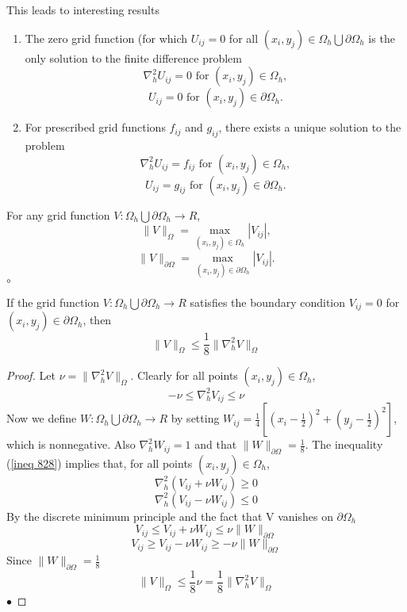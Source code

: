 This leads to interesting results
\begin{proposition}
\begin{enumerate}
\item
The zero grid function (for which $U_{ij}=0$ for all $(x_i,y_j) \in \Omega_h \bigcup \partial\Omega_h$
is the only solution to the finite difference problem
\[\nabla_h^2U_{ij}=0 \mbox{ for }(x_i,y_j)\in\Omega_h,\]
\[U_{ij}=0 \mbox{ for }(x_i,y_j)\in\partial\Omega_h.\]
\item
For prescribed grid functions $f_{ij}$ and $g_{ij}$, there exists a unique solution to the problem
\[\nabla_h^2U_{ij}=f_{ij} \mbox{ for }(x_i,y_j)\in\Omega_h,\]
\[U_{ij}=g_{ij} \mbox{ for }(x_i,y_j)\in\partial\Omega_h.\]
\end{enumerate}
\end{proposition}
\begin{definition}
For any grid function $V:\Omega_h\bigcup\partial\Omega_h \rightarrow R$,
\[\lVert V\rVert_{\Omega} =\max_{(x_i,y_j)\in\Omega_h}|V_{ij}|, \]
\[\lVert V\rVert_{\partial\Omega} =\max_{(x_i,y_j)\in\partial\Omega_h}|V_{ij}|. \]
$\circ$
\end{definition}
\begin{lemma}
If the grid function $V:\Omega_h\bigcup\partial\Omega_h\rightarrow R$ satisfies the boundary condition $V_{ij}=0$ for $(x_i,y_j)\in \partial\Omega_h$, then
\[\lVert V\rVert_{\Omega}\leq \frac{1}{8}\lVert \nabla_h^2V\rVert_{\Omega} \]
\end{lemma}
\begin{proof}
Let $\nu = \lVert \nabla_{h}^2V\rVert_{\Omega}$. Clearly for all points $(x_i,y_j)\in\Omega_h$,
\begin{equation}\label{ineq 828}
-\nu \leq \nabla_{h}^2V_{ij} \leq \nu \end{equation}
Now we define $W:\Omega_h \bigcup \partial\Omega_h \rightarrow R$ by setting 
$W_{ij}=\frac{1}{4}[(x_i-\frac{1}{2})^2+(y_j-\frac{1}{2})^2]$, which is nonnegative.  Also $\nabla_h^2W_{ij}=1$ and that $\lVert W\rVert_{\partial\Omega}=\frac{1}{8}$.
The inequality (\ref{ineq 828}) implies that, for all points $(x_i,y_j)\in\Omega_h$,
\[\nabla_h^2(V_{ij}+\nu W_{ij})\geq 0 \]
\[\nabla_h^2(V_{ij}-\nu W_{ij})\leq 0 \]
By the discrete minimum principle and the fact that V vanishes on $\partial\Omega_h$
\[V_{ij}\leq V_{ij}+\nu W_{ij}\leq \nu\lVert W\rVert_{\partial\Omega} \]
\[V_{ij}\geq V_{ij}-\nu W_{ij}\geq -\nu\lVert W\rVert_{\partial\Omega} \]
Since $\lVert W\rVert_{\partial\Omega}=\frac{1}{8}$
\[\lVert V\rVert_{\Omega}\leq \frac{1}{8}\nu =\frac{1}{8}\lVert \nabla_h^2V\rVert_{\Omega} \]
$\bullet$\end{proof}
